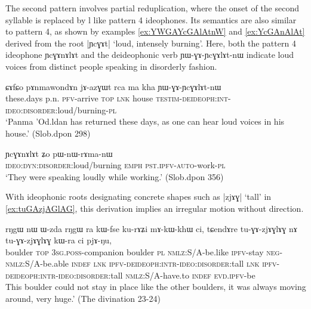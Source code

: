 \documentclass[oldfontcommands,oneside,a4paper,11pt]{article}
\newcommand{\ipa}[1]{{\phon \mbox{#1}}} %
\begin{document}
The second pattern involves partial reduplication, where the onset of the second syllable is replaced by \ipa{l} like pattern 4 ideophones. Its semantics are also similar to pattern 4, as shown by examples  \ref{ex:YWGAYcGAlAtnW} and \ref{ex:YcGAnAlAt} derived from the root |\ipa{ɲcɣɤt}| `loud, intensely burning'. Here, both the  pattern 4 ideophone \ipa{ɲcɣɤnɤlɤt}  and the deideophonic verb  \ipa{ɲɯ-ɣɤ-ɲcɣɤlɤt-nɯ} indicate loud voices from distinct people speaking in disorderly fashion.

     \begin{exe}
\ex \label{ex:YWGAYcGAlAtnW}
\gll 
\ipa{ɕɤfɕo}  	\ipa{pɤnmawondɤn}  	\ipa{jɤ-azɣɯt}  	\ipa{rca}  	\ipa{ma}  	\ipa{kha}  	\ipa{ɲɯ-ɣɤ-ɲcɣɤlɤt-nɯ}  \\
these.days p.n. \textsc{pfv}-arrive \textsc{top} \textsc{lnk} house \textsc{testim-deideoph:int-ideo:disorder:}loud/burning-\textsc{pl}\\
\glt `Panma 'Od.ldan has returned these days, as one can hear loud voices in his house.' (Slob.dpon 298)
\end{exe}

     \begin{exe}
\ex \label{ex:YcGAnAlAt}
\gll 
\ipa{ɲcɣɤnɤlɤt}  	\ipa{ʑo}  	\ipa{pɯ-nɯ-rɤma-nɯ}  \\
\textsc{ideo:dyn:disorder}:loud/burning \textsc{emph} \textsc{pst.ipfv-auto}-work-\textsc{pl} \\
\glt `They were speaking loudly while working.' (Slob.dpon 356)
\end{exe}

With ideophonic roots designating concrete shapes such as  |\ipa{zjɤɣ}| `tall' in \ref{ex:tuGAzjAGlAG}, this derivation  implies an irregular motion   without direction.  

     \begin{exe}
\ex \label{ex:tuGAzjAGlAG}
\gll 
\ipa{rŋgɯ}  	\ipa{nɯ}  	\ipa{ɯ-zda}  	\ipa{rŋgɯ}  	\ipa{ra}  	\ipa{kɯ-fse}  	\ipa{ku-rɤʑi}  	\ipa{mɤ-kɯ-khɯ}  	\ipa{ci,}  	\ipa{tɕendɤre}  	\ipa{tu-ɣɤ-zjɤɣlɤɣ}  	\ipa{nɤ}  	\ipa{tu-ɣɤ-zjɤɣlɤɣ}  	\ipa{kɯ-ra}  	\ipa{ci}  	\ipa{pjɤ-ŋu,}  	 \\
boulder \textsc{top} \textsc{3sg.poss}-companion boulder \textsc{pl} \textsc{nmlz}:S/A-be.like \textsc{ipfv}-stay \textsc{neg-nmlz}:S/A-be.able \textsc{indef} \textsc{lnk} \textsc{ipfv-deideoph:intr-ideo:disorder}:tall \textsc{lnk} \textsc{ipfv-deideoph:intr-ideo:disorder}:tall \textsc{nmlz}:S/A-have.to \textsc{indef} \textsc{evd.ipfv}-be \\
\glt  This boulder could not stay in place like the other boulders, it was always moving around, very huge.' (The divination 23-24)
\end{exe}
\end{document}
